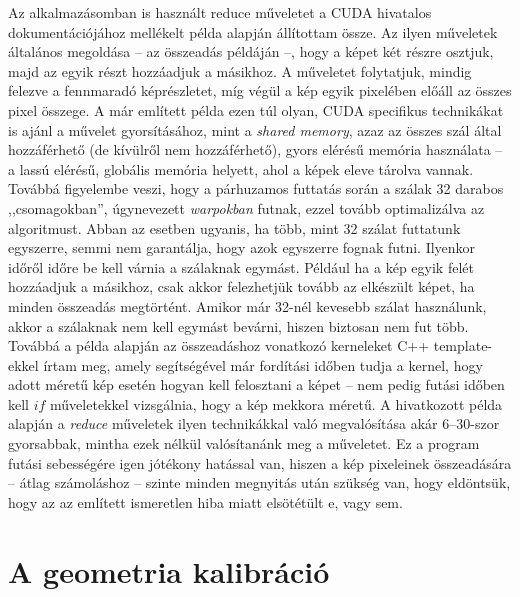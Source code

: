\documentclass[a4paper,12pt]{article}
\begin{document}
Az alkalmazásomban is használt reduce műveletet  a CUDA hivatalos dokumentációjához mellékelt példa \cite{reduce} alapján állítottam össze. Az ilyen műveletek általános megoldása -- az összeadás példáján --, hogy a képet két részre osztjuk, majd az egyik részt hozzáadjuk a másikhoz. A műveletet folytatjuk, mindig felezve a fennmaradó képrészletet, míg végül a kép egyik pixelében előáll az összes pixel összege. A már említett példa ezen túl olyan, CUDA specifikus technikákat is ajánl a művelet gyorsításához, mint a \emph{shared memory}, azaz az összes szál által hozzáférhető (de kívülről nem hozzáférhető), gyors elérésű memória használata -- a lassú elérésű, globális memória helyett, ahol a képek eleve tárolva vannak. Továbbá figyelembe veszi, hogy a párhuzamos futtatás során a szálak 32 darabos ,,csomagokban'',  úgynevezett \emph{warpokban} futnak, ezzel tovább optimalizálva az algoritmust. Abban az esetben ugyanis, ha több, mint 32 szálat futtatunk egyszerre, semmi nem garantálja, hogy azok egyszerre fognak futni. Ilyenkor időről időre be kell várnia a szálaknak egymást. Például ha a kép egyik felét hozzáadjuk a másikhoz, csak akkor felezhetjük tovább az elkészült képet, ha minden összeadás megtörtént. Amikor már 32-nél kevesebb szálat használunk, akkor a szálaknak nem kell egymást bevárni, hiszen biztosan nem fut több. Továbbá a példa alapján az összeadáshoz vonatkozó kerneleket C++ template-ekkel írtam meg, amely segítségével már fordítási időben tudja a kernel, hogy adott méretű kép esetén hogyan kell felosztani a képet -- nem pedig futási időben kell $if$ műveletekkel vizsgálnia, hogy a kép mekkora méretű. A hivatkozott példa alapján a \emph{reduce} műveletek ilyen technikákkal való megvalósítása akár $6$--$30$-szor gyorsabbak, mintha ezek nélkül valósítanánk meg a műveletet. Ez a program futási sebességére igen jótékony hatással van, hiszen a kép pixeleinek összeadására -- átlag számoláshoz -- szinte minden megnyitás után szükség van, hogy eldöntsük, hogy az az említett ismeretlen hiba miatt elsötétült e, vagy sem. 




\section{A geometria kalibráció}
\end{document}
